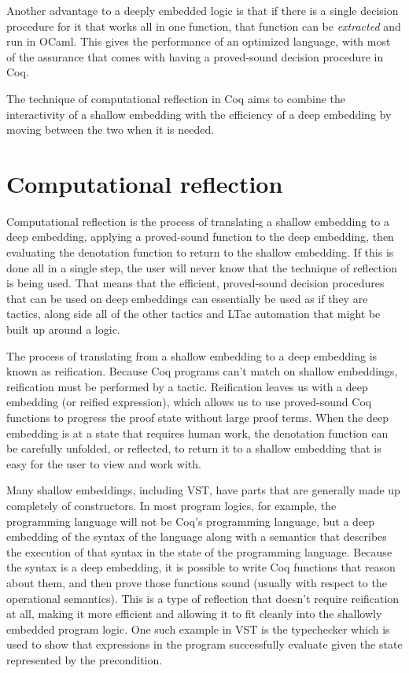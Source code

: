 \documentclass{puthesis}
\begin{document}
Another advantage to a deeply embedded logic is that if there is a
single decision procedure for it that works all in one function, that
function can be \emph{extracted} and run in OCaml. This gives the
performance of an optimized language, with most of the assurance that
comes with having a proved-sound decision procedure in Coq.

The technique of computational reflection in Coq aims to combine the
interactivity of a shallow embedding with the efficiency of a deep
embedding by moving between the two when it is needed.

\section{Computational reflection}

Computational reflection is the process of translating a shallow
embedding to a deep embedding, applying a proved-sound function to the
deep embedding, then evaluating the denotation function to return to
the shallow embedding. If this is done all in a single step, the user
will never know that the technique of reflection is being used. That
means that the efficient, proved-sound decision procedures that can be
used on deep embeddings can essentially be used as if they are
tactics, along side all of the other tactics and LTac automation that
might be built up around a logic. 

The process of translating from a shallow embedding to a deep
embedding is known as reification. Because Coq programs can't match on
shallow embeddings, reification must be performed by a
tactic. Reification leaves us with a deep embedding (or reified
expression), which allows us to use proved-sound Coq functions to
progress the proof state without large proof terms. When the deep
embedding is at a state that requires human work, the denotation
function can be carefully unfolded, or reflected, to return it to a
shallow embedding that is easy for the user to view and work with.


Many shallow embeddings, including VST, have parts that are generally
made up completely of constructors. In most program logics, for
example, the programming language will not be Coq's programming
language, but a deep embedding of the syntax of the language along
with a semantics that describes the execution of that syntax in the
state of the programming language. Because the syntax is a deep
embedding, it is possible to write Coq functions that reason about
them, and then prove those functions sound (usually with respect to
the operational semantics). This is a type of reflection that doesn't
require reification at all, making it more efficient and allowing it
to fit cleanly into the shallowly embedded program logic. One such
example in VST is the typechecker which is used to show that
expressions in the program successfully evaluate given the state
represented by the precondition.
\end{document}

